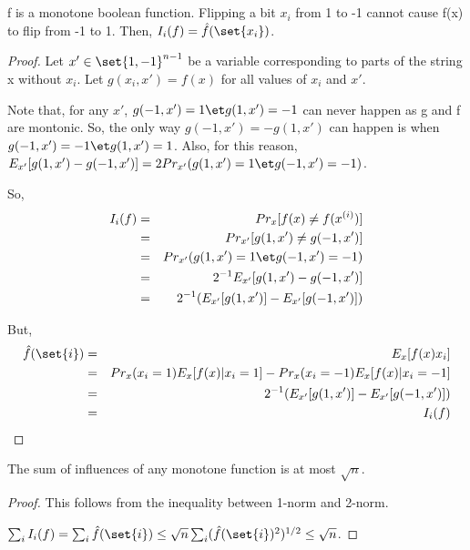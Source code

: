 \documentclass[10pt]{amsart}
\begin{document}
\section{}
\begin{thm}
f is a monotone boolean function. Flipping a bit $x_{i}$ from 1 to -1 cannot cause f(x) to flip from -1 to 1. Then, $I_{i}(f) = \hat{f}(\set{x_{i}})$.
\end{thm}
\begin{proof}
Let $x' \in \set{1,-1}^{n-1}$ be a variable corresponding to parts of the string x without $x_{i}$. Let $g(x_{i}, x') = f(x)$ for all values of $x_{i}$ and $x'$.

Note that, for any $x'$, $g(-1,x') = 1 \et g(1,x') = -1$ can never happen as g and f are montonic. So, the only way $g(-1,x') = -g(1,x')$ can happen is when $g(-1,x') = -1 \et g(1,x') = 1$. Also, for this reason, $E_{x'}[g(1,x') - g(-1,x')] = 2 Pr_{x'}(g(1,x') = 1 \et g(-1,x') = -1 ) $.

So,
\begin{eqnarray*}
I_{i}(f) &=& Pr_{x}[f(x) \neq f(x^{(i)})]\\
&=& Pr_{x'}[g(1,x') \neq g(-1,x')]\\
&=& Pr_{x'}(g(1,x') = 1 \et g(-1,x') = -1 )\\
&=& 2^{-1}E_{x'}[g(1,x') - g(-1,x')]\\
&=& 2^{-1}(E_{x'}[g(1,x')] - E_{x'}[g(-1,x')])\\
\end{eqnarray*}


But,
\begin{eqnarray*}
\hat{f}(\set{i}) &=& E_{x}[f(x)x_{i}]\\
&=& Pr_{x}(x_{i}=1)E_{x}[f(x)|x_{i}=1] - Pr_{x}(x_{i}=-1)E_{x}[f(x)|x_{i}=-1]\\
&=& 2^{-1}(E_{x'}[g(1,x')] - E_{x'}[g(-1,x')])\\
&=& I_{i}(f)\\
\end{eqnarray*}

\end{proof}

\begin{cor}
The sum of influences of any monotone function is at most $\sqrt{n}$.
\end{cor}
\begin{proof}
This follows from the inequality between 1-norm and 2-norm.

$\sum_{i}I_{i}(f) = \sum_{i} \hat{f}(\set{i}) \leq \sqrt{n}\sum_{i} (\hat{f}(\set{i})^{2})^{1/2} \leq \sqrt{n}$.
\end{proof}
\end{document}
